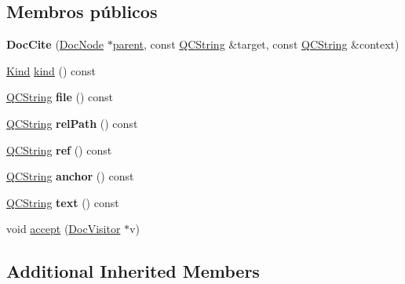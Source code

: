 \subsection*{Membros públicos}
\begin{DoxyCompactItemize}
\item 
\hypertarget{class_doc_cite_a50b52dd071ad57a275625e13c65dd954}{{\bfseries Doc\-Cite} (\hyperlink{class_doc_node}{Doc\-Node} $\ast$\hyperlink{class_doc_node_abd7f070d6b0a38b4da71c2806578d19d}{parent}, const \hyperlink{class_q_c_string}{Q\-C\-String} \&target, const \hyperlink{class_q_c_string}{Q\-C\-String} \&context)}\label{class_doc_cite_a50b52dd071ad57a275625e13c65dd954}

\item 
\hyperlink{class_doc_node_aa10c9e8951b8ccf714a59ec321bdac5b}{Kind} \hyperlink{class_doc_cite_aa9d037bed9f9a083d0cd01485637d843}{kind} () const 
\item 
\hypertarget{class_doc_cite_aeaa8cdb0fbabc1058b7d3813f2fd223b}{\hyperlink{class_q_c_string}{Q\-C\-String} {\bfseries file} () const }\label{class_doc_cite_aeaa8cdb0fbabc1058b7d3813f2fd223b}

\item 
\hypertarget{class_doc_cite_a3aa6799d4713d51d9cc4862af165671c}{\hyperlink{class_q_c_string}{Q\-C\-String} {\bfseries rel\-Path} () const }\label{class_doc_cite_a3aa6799d4713d51d9cc4862af165671c}

\item 
\hypertarget{class_doc_cite_aba9c65e4f9c616d6552a1b5d5e9519a6}{\hyperlink{class_q_c_string}{Q\-C\-String} {\bfseries ref} () const }\label{class_doc_cite_aba9c65e4f9c616d6552a1b5d5e9519a6}

\item 
\hypertarget{class_doc_cite_acd17ae1d9600f864b1beb85dfb99a4f4}{\hyperlink{class_q_c_string}{Q\-C\-String} {\bfseries anchor} () const }\label{class_doc_cite_acd17ae1d9600f864b1beb85dfb99a4f4}

\item 
\hypertarget{class_doc_cite_a367883e6ba4151924745ee021c01b5e7}{\hyperlink{class_q_c_string}{Q\-C\-String} {\bfseries text} () const }\label{class_doc_cite_a367883e6ba4151924745ee021c01b5e7}

\item 
void \hyperlink{class_doc_cite_a7ba716e854ae2f8f87a4eb2140e302b6}{accept} (\hyperlink{class_doc_visitor}{Doc\-Visitor} $\ast$v)
\end{DoxyCompactItemize}
\subsection*{Additional Inherited Members}


